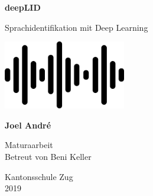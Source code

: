 \begin{titlepage}
    \begin{center}
        \vspace*{1cm}
        
        \Huge
        \textbf{deepLID}
        
        \vspace{0.5cm}
        \LARGE
        Sprachidentifikation mit Deep Learning
        
        \vspace{3cm}
        
        \includegraphics[width=0.4\textwidth]{assets/front.png}
        
        \vfill
        
        \textbf{Joel André}
        \vspace{1.5cm}
        
        
        \Large
        Maturaarbeit\\
        Betreut von
        Beni Keller
        
        \vspace{0.8cm}
        
        
        Kantonsschule Zug\\
        2019
        
    \end{center}
\end{titlepage}